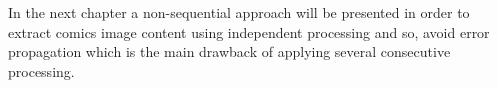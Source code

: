 
In the next chapter a non-sequential approach will be presented in order to extract comics image content using independent processing and so, avoid error propagation which is the main drawback of applying several consecutive processing.



